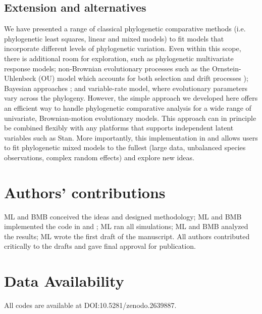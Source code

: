 \documentclass[12pt]{article}
\begin{document}
\subsection*{Extension and alternatives}

We have presented a range of classical phylogenetic comparative methods (i.e. phylogenetic least squares, linear and mixed models) to fit models that incorporate different levels of phylogenetic variation.
Even within this scope, there is additional room for exploration, such as phylogenetic multivariate response models; non-Brownian evolutionary processes such as the Ornstein-Uhlenbeck (OU) model which accounts for both selection and drift processes \citep{butler2004phylogenetic}); Bayesian approaches \citep{hadfield2010general}; and variable-rate model, where evolutionary parameters vary across the phylogeny.
However, the simple approach we developed here offers an efficient way to handle phylogenetic comparative analysis for a wide range of univariate, Brownian-motion evolutionary models. 
This approach can in principle be combined flexibly with any platforms that supports independent latent variables such as Stan.
More importantly, this implementation in  and  allows users to fit phylogenetic mixed models to the fullest (large data, unbalanced species observations, complex random effects) and explore new ideas.

\section*{Authors’ contributions}

ML and BMB conceived the ideas and designed methodology; ML and BMB implemented the code in  and ; ML ran all simulations; ML and BMB analyzed the results; ML wrote the first draft of the manuscript. All authors contributed critically to the drafts and gave final approval for publication.

\section*{Data Availability}

All codes are available at DOI:10.5281/zenodo.2639887.

% 
\end{document}
